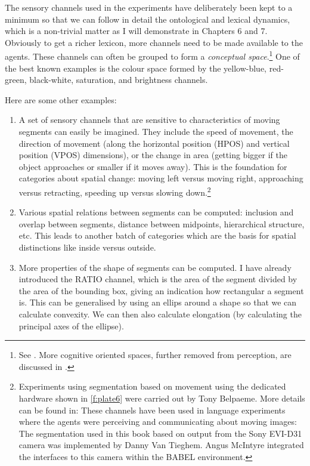 The sensory channels used in the experiments have
deliberately been kept to a minimum so that we can follow 
in detail the ontological and lexical dynamics, which is a 
non-trivial matter as I will demonstrate in Chapters 6 and 7.
Obviously to get a richer lexicon, more channels need to be made 
available to the agents. These channels can often be 
grouped to form a {\it conceptual space}.\footnote{See \cite{Gardenfors:1999}. 
More cognitive oriented spaces, further removed 
from perception, are discussed in \cite{Fauconnier:1994}.} One of the 
best known examples is the colour space formed by the
yellow-blue, red-green, black-white, saturation, and brightness channels. 

Here are some other examples: 
\begin{enumerate}
\item A set of sensory channels that are sensitive 
to characteristics of moving segments can easily be 
imagined. They include the speed
of movement, the direction of movement (along the 
horizontal position (HPOS) and vertical position (VPOS) 
dimensions), or the change in area (getting bigger if the object 
approaches or smaller if it moves away). This is the foundation
for categories about spatial change: moving left versus moving right,
approaching versus retracting, speeding up versus slowing down.\footnote{Experiments
using segmentation based on movement
using the dedicated hardware shown in \ref{f:plate6} were carried out by Tony Belpaeme. 
More details can be found in: \cite{Belpaeme:1998} These channels have been used in
language experiments where the agents were 
perceiving and communicating about moving 
images: \cite{Steels:1998}  
The segmentation used in this book 
based on output from the Sony EVI-D31 camera was 
implemented by Danny Van Tieghem. Angus McIntyre integrated
the interfaces to this camera within the BABEL environment. 
}

\item Various spatial relations between segments can be computed: 
inclusion and overlap between segments, distance between 
midpoints, hierarchical structure, etc. 
This leads to another batch of categories which are
the basis for spatial distinctions like inside versus outside. 

\item More properties of the shape of segments can be computed.
I have already introduced the RATIO channel, which is the area of the 
segment divided by the area of the bounding box, giving an 
indication how rectangular a segment is. This can be generalised
by using an ellips around a shape so that we can calculate
convexity. We can then also calculate elongation (by calculating
the principal axes of the ellipse). 
\end{enumerate}

